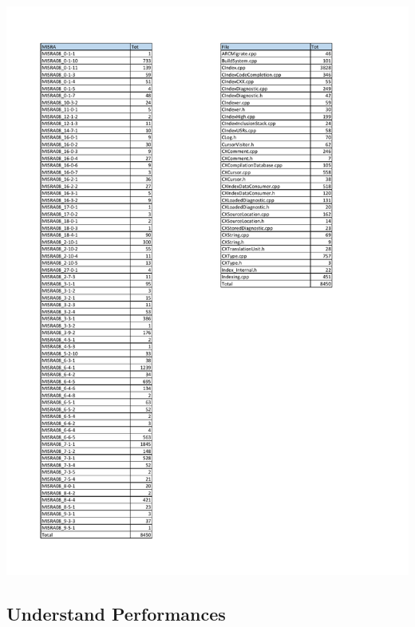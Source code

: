 \begin{minipage}{\linewidth}
	\includegraphics[width=\textwidth]{pdf/Misra_Summary.pdf}
\end{minipage}

\subsection{Understand Performances}